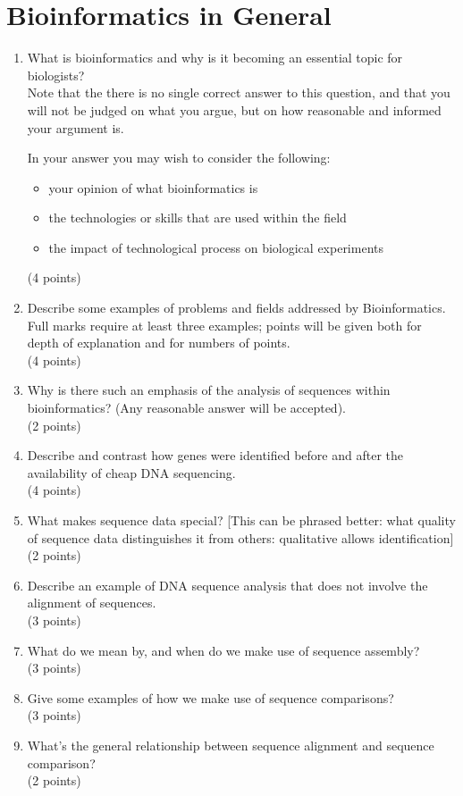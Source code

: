 \documentclass[11pt]{article}
\begin{document}
\section{Bioinformatics in General}
\begin{enumerate}
\item What is bioinformatics and why is it becoming an essential topic for
  biologists?\\
  Note that the there is no single correct answer to this question, and that
  you will not be judged on what you argue, but on how reasonable and informed
  your argument is.
  
  In your answer you may wish to consider the following:
  \begin{itemize}
  \item your opinion of what bioinformatics is
  \item the technologies or skills that are used within the field
  \item the impact of technological process on biological experiments
  \end{itemize}
  (4 points)
  \item Describe some examples of problems and fields addressed by
    Bioinformatics. Full marks require at least three examples; points
    will be given both for depth of explanation and for numbers of points.\\
    (4 points)
  \item Why is there such an emphasis of the analysis of sequences within
    bioinformatics? (Any reasonable answer will be accepted).\\
    (2 points)
  \item Describe and contrast how genes were identified before and after the
    availability of cheap DNA sequencing.\\
    (4 points)
  \item What makes sequence data special?  [This can be phrased better: what quality
    of sequence data distinguishes it from others: qualitative allows identification]\\
    (2 points)
  \item Describe an example of DNA sequence analysis that does not involve the
    alignment of sequences.\\
    (3 points)
  \item What do we mean by, and when do we make use of sequence assembly?\\
    (3 points)
  \item Give some examples of how we make use of sequence comparisons?\\
    (3 points)
  \item What's the general relationship between sequence alignment and
    sequence comparison?\\
    (2 points)
\end{enumerate}
\end{document}
